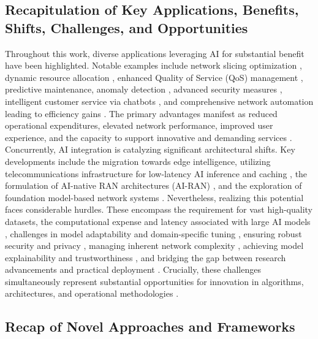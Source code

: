 \documentclass[sigconf]{acmart}
\begin{document}
\subsection{Recapitulation of Key Applications, Benefits, Shifts, Challenges, and Opportunities}
\label{subsec:recap_apps_benefits_challenges}

Throughout this work, diverse applications leveraging AI for substantial benefit have been highlighted. Notable examples include network slicing optimization \cite{ref11}, dynamic resource allocation \cite{ref1, ref8}, enhanced Quality of Service (QoS) management \cite{ref11, ref13, ref14}, predictive maintenance, anomaly detection \cite{ref1, ref9}, advanced security measures \cite{ref5, ref16, ref22, ref30}, intelligent customer service via chatbots \cite{ref2}, and comprehensive network automation leading to efficiency gains \cite{ref1, ref2, ref8, ref26, ref31}. The primary advantages manifest as reduced operational expenditures, elevated network performance, improved user experience, and the capacity to support innovative and demanding services \cite{ref1, ref2, ref8, ref31}. Concurrently, AI integration is catalyzing significant architectural shifts. Key developments include the migration towards edge intelligence, utilizing telecommunications infrastructure for low-latency AI inference and caching \cite{ref3, ref13, ref31}, the formulation of AI-native RAN architectures (AI-RAN) \cite{ref25}, and the exploration of foundation model-based network systems \cite{ref21}. Nevertheless, realizing this potential faces considerable hurdles. These encompass the requirement for vast high-quality datasets, the computational expense and latency associated with large AI models \cite{ref4, ref7, ref9, ref14}, challenges in model adaptability and domain-specific tuning \cite{ref4, ref9, ref18, ref26}, ensuring robust security and privacy \cite{ref3, ref5, ref16, ref30}, managing inherent network complexity \cite{ref1, ref28}, achieving model explainability and trustworthiness \cite{ref21}, and bridging the gap between research advancements and practical deployment \cite{ref2}. Crucially, these challenges simultaneously represent substantial opportunities for innovation in algorithms, architectures, and operational methodologies \cite{ref6, ref9, ref26, ref28, ref29, ref30, ref31, ref32, ref34, ref35}.

\subsection{Recap of Novel Approaches and Frameworks}
\label{subsec:recap_novel_approaches}
\end{document}
